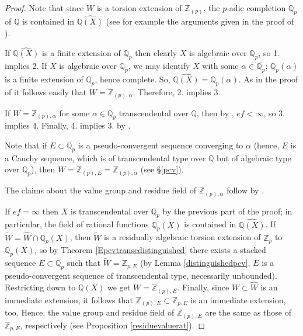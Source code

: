 \documentclass[10pt]{article}
\numberwithin{equation}{section}
\theoremstyle{definition}\newtheorem{Def}[equation]{Definition}
\theoremstyle{definition}\newtheorem{Ques}[equation]{Question}
\newcommand{\Q}{\mathbb{Q}}
\newcommand{\Z}{\mathbb{Z}}
\newcommand{\oQp}{\overline{\Q_p}}
\newcommand{\wW}{\widetilde{W}}
\begin{document}
\begin{proof}
Note that since $W$ is a torsion extension of $\Z_{(p)}$, the $p$-adic completion $\Q_p$ of $\Q$ is contained in $\widehat{\Q(X)}$ (see for example the arguments given in the proof of \cite[Corollary 2.6]{APZTheorem}).

If $\widehat{\Q(X)}$ is a finite extension of $\Q_p$ then clearly $X$ is algebraic over $\Q_p$, so 1. implies 2. If $X$ is algebraic over $\Q_p$, we may identify $X$ with some $\alpha\in\oQp$; $\Q_p(\alpha)$ is a finite extension of $\Q_p$, hence complete. So, $\widehat{\Q(X)}=\Q_p(\alpha)$. As in the proof of \cite[Theorem 2.5]{PerTransc} it follows easily that $W=\Z_{(p),\alpha}$. Therefore, 2. implies 3. 

If $W=\Z_{(p),\alpha}$ for some $\alpha\in\oQp$ transcendental over $\Q$, then by \cite[Proposition 2.2]{PerTransc}, $ef<\infty$, so 3. implies 4. Finally, 4. implies 3. by \cite[Lemma 2.4]{PerTransc}.

Note that if $E\subset\oQp$ is a pseudo-convergent sequence converging to $\alpha$ (hence, $E$ is a Cauchy sequence, which is of transcendental type over $\Q$ but of algebraic type over $\Q_p$), then $W=\Z_{(p),E}=\Z_{(p),\alpha}$ (see \S \ref{pcv}).

The claims about the value group and residue field of $\Z_{(p),\alpha}$ follow by \cite[Proposition 2.2]{PerTransc}.
 
\medskip

If $ef=\infty$ then $X$ is transcendental over $\Q_p$ by the previous part of the proof; in particular, the field of rational functions $\Q_p(X)$ is contained in $\widehat{\Q(X)}$. If $\wW=\widehat{W}\cap\Q_p(X)$, then $\wW$ is a residually algebraic torsion extension of $\Z_p$ to $\Q_p(X)$, so by Theorem \ref{Epcvtranscdistinguished} there exists a stacked sequence $E\subset\oQp$ such that $\wW=\Z_{p,E}$ (by Lemma \ref{distinguishedpcv}, $E$ is a pseudo-convergent sequence of transcendental type, necessarily unbounded). Restricting down to $\Q(X)$ we get $W=\Z_{(p),E}$. Finally, since $W\subset\widehat{W}$ is an immediate extension, it follows that $\Z_{(p),E}\subset\Z_{p,E}$ is an immediate extension, too. Hence, the value group and residue field of $\Z_{(p),E}$ are the same as those of $\Z_{p,E}$, respectively (see Proposition \ref{residuevaluerat}).
\end{proof}
\end{document}
